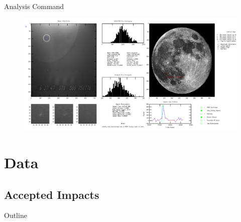 \documentclass[pdf]{beamer}
\begin{document}
 \begin{frame}{Analysis Command}
   \begin{figure}[h!]
	 \centering
	 \includegraphics[width=\textwidth]{Images/viewer.png}
   \end{figure}
\end{frame}

 \section{Data}

 \subsection{Accepted Impacts}

 \begin{frame}{Outline}
   \tableofcontents[currentsection]
 \end{frame}
\end{document}
